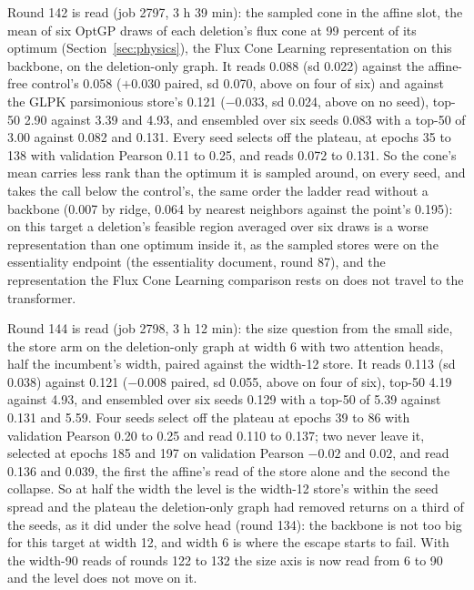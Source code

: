 Round 142 is read (job 2797, 3 h 39 min): the sampled cone in the affine slot, the mean
of six OptGP draws of each deletion's flux cone at 99 percent of its optimum
(Section~\ref{sec:physics}), the Flux Cone Learning representation on this backbone,
on the deletion-only graph. It reads 0.088 (sd 0.022) against the affine-free control's
0.058 ($+0.030$ paired, sd 0.070, above on four of six) and against the GLPK
parsimonious store's 0.121 ($-0.033$, sd 0.024, above on no seed), top-50 2.90 against
3.39 and 4.93, and ensembled over six seeds 0.083 with a top-50 of 3.00 against 0.082
and 0.131. Every seed selects off the plateau, at epochs 35 to 138 with validation
Pearson 0.11 to 0.25, and reads 0.072 to 0.131. So the cone's mean carries less rank
than the optimum it is sampled around, on every seed, and takes the call below the
control's, the same order the ladder read without a backbone (0.007 by ridge, 0.064 by
nearest neighbors against the point's 0.195): on this target a deletion's feasible
region averaged over six draws is a worse representation than one optimum inside it,
as the sampled stores were on the essentiality endpoint (the essentiality document,
round 87), and the representation the Flux Cone Learning comparison rests on does not
travel to the transformer.

Round 144 is read (job 2798, 3 h 12 min): the size question from the small side, the
store arm on the deletion-only graph at width 6 with two attention heads, half the
incumbent's width, paired against the width-12 store. It reads 0.113 (sd 0.038)
against 0.121 ($-0.008$ paired, sd 0.055, above on four of six), top-50 4.19 against
4.93, and ensembled over six seeds 0.129 with a top-50 of 5.39 against 0.131 and 5.59.
Four seeds select off the plateau at epochs 39 to 86 with validation Pearson 0.20 to
0.25 and read 0.110 to 0.137; two never leave it, selected at epochs 185 and 197 on
validation Pearson $-0.02$ and 0.02, and read 0.136 and 0.039, the first the affine's
read of the store alone and the second the collapse. So at half the width the level is
the width-12 store's within the seed spread and the plateau the deletion-only graph had
removed returns on a third of the seeds, as it did under the solve head (round 134): the
backbone is not too big for this target at width 12, and width 6 is where the escape
starts to fail. With the width-90 reads of rounds 122 to 132 the size axis is now read
from 6 to 90 and the level does not move on it.

